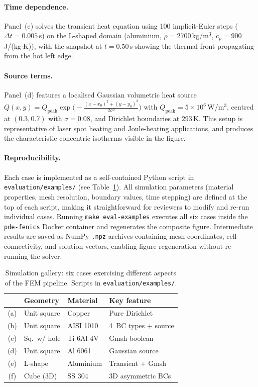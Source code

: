 \documentclass[preprint,review,12pt]{elsarticle}
\begin{document}
\paragraph{Time dependence.}
Panel~(e) solves the transient heat equation using 100 implicit-Euler
steps ($\Delta t = 0.005$\,s) on the L-shaped domain (aluminium,
$\rho=2700$\,kg/m$^3$, $c_p=900$\,J/(kg$\cdot$K)), with the
snapshot at $t=0.50$\,s showing the thermal front propagating from
the hot left edge.

\paragraph{Source terms.}
Panel~(d) features a localised Gaussian volumetric heat source
$Q(x,y) = Q_\mathrm{peak} \exp\!\bigl(-\frac{(x-x_0)^2 +
(y-y_0)^2}{2\sigma^2}\bigr)$ with $Q_\mathrm{peak} = 5 \times 10^6$\,W/m$^3$,
centred at $(0.3, 0.7)$ with $\sigma=0.08$, and Dirichlet boundaries
at $293$\,K.  This setup is representative of laser spot heating and
Joule-heating applications, and produces the characteristic concentric
isotherms visible in the figure.

\paragraph{Reproducibility.}
Each case is implemented as a self-contained Python script in
\texttt{evaluation/examples/} (see Table~\ref{tab:gallery}).
All simulation parameters (material properties, mesh resolution,
boundary values, time stepping) are defined at the top of each script,
making it straightforward for reviewers to modify and re-run individual
cases.  Running \texttt{make eval-examples} executes all six cases
inside the \texttt{pde-fenics} Docker container and regenerates the
composite figure.  Intermediate results are saved as NumPy
\texttt{.npz} archives containing mesh coordinates, cell connectivity,
and solution vectors, enabling figure regeneration without re-running
the solver.

\begin{table}[htbp]
  \centering\footnotesize
  \caption{Simulation gallery: six cases exercising different aspects
    of the FEM pipeline.  Scripts in \texttt{evaluation/examples/}.}
  \label{tab:gallery}
  \setlength{\tabcolsep}{4pt}
  \begin{tabular}{cllp{2.5cm}}
    \toprule
    & \textbf{Geometry}  & \textbf{Material}  & \textbf{Key feature} \\
    \midrule
    (a) & Unit square     & Copper        & Pure Dirichlet \\
    (b) & Unit square     & AISI 1010     & 4~BC types + source \\
    (c) & Sq.\ w/ hole   & Ti-6Al-4V     & Gmsh boolean \\
    (d) & Unit square     & Al 6061       & Gaussian source \\
    (e) & L-shape         & Aluminium     & Transient + Gmsh \\
    (f) & Cube (3D)       & SS 304        & 3D asymmetric BCs \\
    \bottomrule
  \end{tabular}
\end{table}
\end{document}
